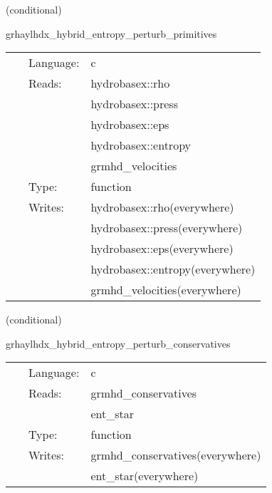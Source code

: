 \documentclass{article}
\begin{document}
\vspace{5mm}

   (conditional) 

\hspace{5mm} grhaylhdx\_hybrid\_entropy\_perturb\_primitives 

\hspace{5mm}{\it entropy+hybrid version of grhaylhdx\_perturb\_primitives } 


\hspace{5mm}

 \begin{tabular*}{160mm}{cll} 
~ & Language:  & c \\ 
~ & Reads:  & hydrobasex::rho \\ 
~& ~ &hydrobasex::press\\ 
~& ~ &hydrobasex::eps\\ 
~& ~ &hydrobasex::entropy\\ 
~& ~ &grmhd\_velocities\\ 
~ & Type:  & function \\ 
~ & Writes:  & hydrobasex::rho(everywhere) \\ 
~& ~ &hydrobasex::press(everywhere)\\ 
~& ~ &hydrobasex::eps(everywhere)\\ 
~& ~ &hydrobasex::entropy(everywhere)\\ 
~& ~ &grmhd\_velocities(everywhere)\\ 
\end{tabular*} 


\vspace{5mm}

   (conditional) 

\hspace{5mm} grhaylhdx\_hybrid\_entropy\_perturb\_conservatives 

\hspace{5mm}{\it entropy+hybrid version of grhaylhdx\_perturb\_conservatives } 


\hspace{5mm}

 \begin{tabular*}{160mm}{cll} 
~ & Language:  & c \\ 
~ & Reads:  & grmhd\_conservatives \\ 
~& ~ &ent\_star\\ 
~ & Type:  & function \\ 
~ & Writes:  & grmhd\_conservatives(everywhere) \\ 
~& ~ &ent\_star(everywhere)\\ 
\end{tabular*} 
\end{document}
